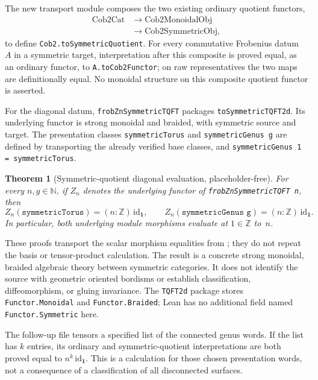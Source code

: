 \documentclass[11pt]{amsart}
\theoremstyle{plain}
\newtheorem{theorem}{Theorem}[section]
\theoremstyle{definition}
\newcommand{\id}{\mathrm{id}}
\begin{document}
The new transport module composes the two existing ordinary quotient functors,
\[
\begin{aligned}
\mathrm{Cob2Cat}&\longrightarrow \mathrm{Cob2MonoidalObj}\\
&\longrightarrow \mathrm{Cob2SymmetricObj},
\end{aligned}
\]
to define \texttt{Cob2.toSymmetricQuotient}. For every commutative Frobenius datum~$A$ in a symmetric target, interpretation after this composite is proved equal, as an ordinary functor, to \texttt{A.toCob2Functor}; on raw representatives the two maps are definitionally equal. No monoidal structure on this composite quotient functor is asserted.

For the diagonal datum, \texttt{frobZnSymmetricTQFT} packages \texttt{toSymmetricTQFT2d}. Its underlying functor is strong monoidal and braided, with symmetric source and target. The presentation classes \texttt{symmetricTorus} and \texttt{symmetricGenus g} are defined by transporting the already verified base classes, and \texttt{symmetricGenus 1 = symmetricTorus}.

\begin{theorem}[Symmetric-quotient diagonal evaluation, placeholder-free]
For every $n,g\in\mathbb N$, if $Z_n$ denotes the underlying functor of \texttt{frobZnSymmetricTQFT n}, then
\[
Z_n(\texttt{symmetricTorus})=(n:\mathbb Z)\,\id_{\mathbf 1},
\qquad
Z_n(\texttt{symmetricGenus g})=(n:\mathbb Z)\,\id_{\mathbf 1}.
\]
In particular, both underlying module morphisms evaluate at $1\in\mathbb Z$ to~$n$.
\end{theorem}

These proofs transport the scalar morphism equalities from ; they do not repeat the basis or tensor-product calculation. The result is a concrete strong monoidal, braided algebraic theory between symmetric categories. It does not identify the source with geometric oriented bordisms or establish classification, diffeomorphism, or gluing invariance. The \texttt{TQFT2d} package stores \texttt{Functor.Monoidal} and \texttt{Functor.Braided}; Lean has no additional field named \texttt{Functor.Symmetric} here.

The follow-up file  tensors a specified list of the connected genus words.  If the list has $k$ entries, its ordinary and symmetric-quotient interpretations are both proved equal to $n^k\,\id_{\mathbf 1}$.  This is a calculation for those chosen presentation words, not a consequence of a classification of all disconnected surfaces.
\end{document}
